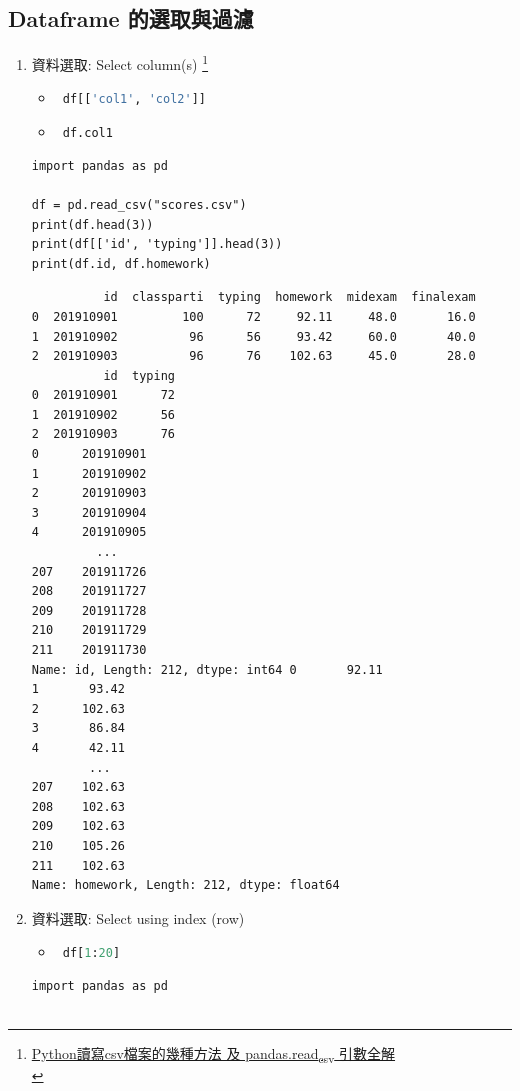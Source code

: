 \documentclass[a4paper,12pt]{article}
\begin{document}
\subsection{Dataframe 的選取與過濾}
\label{sec:orgc07000a}

\begin{enumerate}
\item 資料選取: Select column(s) \footnote{\href{https://www.itread01.com/content/1547569271.html}{Python讀寫csv檔案的幾種方法 及 pandas.read\textsubscript{csv} 引數全解}\\}
\label{sec:org6a098c9}
\begin{itemize}
\item \lstinline[breaklines=true,language=Python]~ df[['col1', 'col2']] ~\\
\item \lstinline[breaklines=true,language=Python]~ df.col1 ~\\
\end{itemize}
\lstset{breaklines=true,language=Python,label= ,caption= ,captionpos=b,firstnumber=1,numbers=left}
\begin{lstlisting}
import pandas as pd

df = pd.read_csv("scores.csv")
print(df.head(3))
print(df[['id', 'typing']].head(3))
print(df.id, df.homework)
\end{lstlisting}

\begin{verbatim}
          id  classparti  typing  homework  midexam  finalexam
0  201910901         100      72     92.11     48.0       16.0
1  201910902          96      56     93.42     60.0       40.0
2  201910903          96      76    102.63     45.0       28.0
          id  typing
0  201910901      72
1  201910902      56
2  201910903      76
0      201910901
1      201910902
2      201910903
3      201910904
4      201910905
         ...    
207    201911726
208    201911727
209    201911728
210    201911729
211    201911730
Name: id, Length: 212, dtype: int64 0       92.11
1       93.42
2      102.63
3       86.84
4       42.11
        ...  
207    102.63
208    102.63
209    102.63
210    105.26
211    102.63
Name: homework, Length: 212, dtype: float64
\end{verbatim}

\item 資料選取: Select using index (row)
\label{sec:org92a92e7}
\begin{itemize}
\item \lstinline[breaklines=true,language=Python]~ df[1:20] ~\\
\end{itemize}
\lstset{breaklines=true,language=Python,label= ,caption= ,captionpos=b,firstnumber=1,numbers=left}
\begin{lstlisting}
import pandas as pd


\end{lstlisting}
\end{enumerate}
\end{document}
